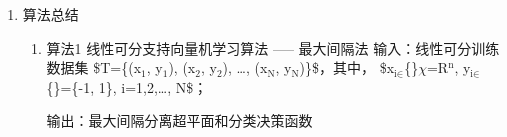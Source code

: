 \documentclass[11pt]{ctexart}
\begin{document}
\begin{enumerate}
\begin{enumerate}
\begin{enumerate}
\begin{lstlisting}
\end{lstlisting}
\item 于是，分离超平面可以写为：
\lstset{language=[LaTeX]TeX,label= ,caption= ,captionpos=b,numbers=none}
\begin{lstlisting}
\begin{equation}
  \sum^{N}_{i=1}\alpha^{\ast}_iy_i(x\cdot{}x_i)+b^{\ast} = 0
\end{equation}
\end{lstlisting}
分离决策函数可以写为：
\lstset{language=[LaTeX]TeX,label= ,caption= ,captionpos=b,numbers=none}
\begin{lstlisting}
\begin{equation}
  f(x) = sign\left( \sum^{N}_{i=1}\alpha^{\ast}_iy_i(x\cdot{}x_i)+b^{\ast} \right)
\end{equation}
\end{lstlisting}
\end{enumerate}
\end{enumerate}
\item 算法总结
\label{sec:orgheadline76}
\begin{enumerate}
\item 算法1 线性可分支持向量机学习算法 ----- 最大间隔法
\label{sec:orgheadline73}
输入：线性可分训练数据集 \$T=\{(x\(_{\text{1}}\), y\(_{\text{1}}\)), (x\(_{\text{2}}\), y\(_{\text{2}}\)), \ldots, (x\(_{\text{N}}\), y\(_{\text{N}}\))\}\$，其中，
\$x\(_{\text{i}\in}\)\{\}\(\chi\)=R\(^{\text{n}}\), y\(_{\text{i}\in}\)\{\}=\{-1, 1\}, i=1,2,\ldots, N\$；

输出：最大间隔分离超平面和分类决策函数


\end{enumerate}
\end{enumerate}
\end{document}
